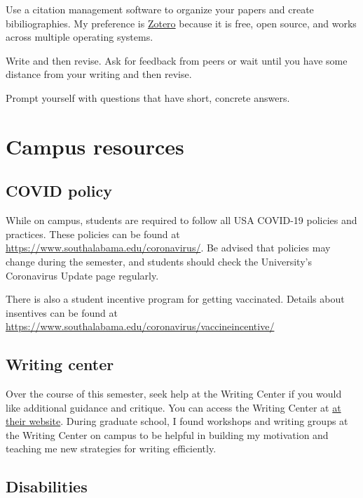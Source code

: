 \documentclass[11pt,]{article}
\begin{document}
Use a citation management software to organize your papers and create
bibiliographies. My preference is \href{https://www.zotero.org/}{Zotero}
because it is free, open source, and works across multiple operating
systems.

Write and then revise. Ask for feedback from peers or wait until you
have some distance from your writing and then revise.

Prompt yourself with questions that have short, concrete answers.

\newpage

\hypertarget{campus-resources}{%
\section{Campus resources}\label{campus-resources}}

\hypertarget{covid-policy}{%
\subsection{COVID policy}\label{covid-policy}}

While on campus, students are required to follow all USA COVID-19
policies and practices. These policies can be found at
\url{https://www.southalabama.edu/coronavirus/}. Be advised that
policies may change during the semester, and students should check the
University's Coronavirus Update page regularly.

There is also a student incentive program for getting vaccinated.
Details about insentives can be found at
\url{https://www.southalabama.edu/coronavirus/vaccineincentive/}

\hypertarget{writing-center}{%
\subsection{Writing center}\label{writing-center}}

Over the course of this semester, seek help at the Writing Center if you
would like additional guidance and critique. You can access the Writing
Center at
\href{https://www.southalabama.edu/departments/academicsuccess/cae/how.it.works.html}{at
their website}. During graduate school, I found workshops and writing
groups at the Writing Center on campus to be helpful in building my
motivation and teaching me new strategies for writing efficiently.

\hypertarget{disabilities}{%
\subsection{Disabilities}\label{disabilities}}
\end{document}
